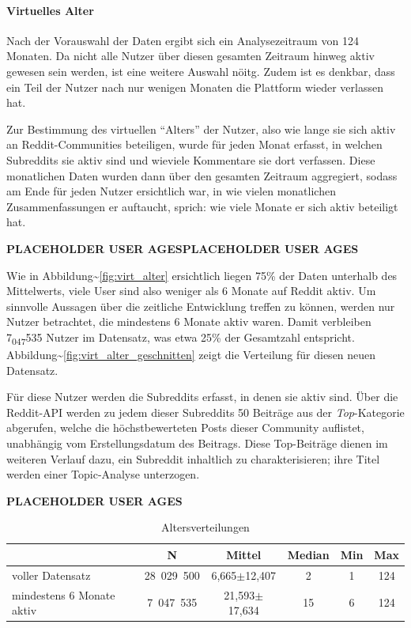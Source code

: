 \documentclass[11pt,a4paper,twoside]{article}
\let\oldpar\paragraph
\renewcommand{\paragraph}{\oldpar*}
\begin{document}
\hypertarget{virtage}{%
\paragraph{Virtuelles Alter}\label{virtage}}

Nach der Vorauswahl der Daten ergibt sich ein Analysezeitraum von 124
Monaten. Da nicht alle Nutzer über diesen gesamten Zeitraum hinweg aktiv
gewesen sein werden, ist eine weitere Auswahl nöitg. Zudem ist es
denkbar, dass ein Teil der Nutzer nach nur wenigen Monaten die Plattform
wieder verlassen hat.

Zur Bestimmung des virtuellen \enquote{Alters} der Nutzer, also wie
lange sie sich aktiv an Reddit-Communities beteiligen, wurde für jeden
Monat erfasst, in welchen Subreddits sie aktiv sind und wieviele
Kommentare sie dort verfassen. Diese monatlichen Daten wurden dann über
den gesamten Zeitraum aggregiert, sodass am Ende für jeden Nutzer
ersichtlich war, in wie vielen monatlichen Zusammenfassungen er
auftaucht, sprich: wie viele Monate er sich aktiv beteiligt hat.

\textbf{PLACEHOLDER USER AGESPLACEHOLDER USER AGES}

Wie in Abbildung\textasciitilde{}\ref{fig:virt_alter} ersichtlich liegen
75\% der Daten unterhalb des Mittelwerts, viele User sind also weniger
als 6 Monate auf Reddit aktiv. Um sinnvolle Aussagen über die zeitliche
Entwicklung treffen zu können, werden nur Nutzer betrachtet, die
mindestens 6 Monate aktiv waren. Damit verbleiben
7\textsubscript{047}535 Nutzer im Datensatz, was etwa 25\% der
Gesamtzahl entspricht.
Abbildung\textasciitilde{}\ref{fig:virt_alter_geschnitten} zeigt die
Verteilung für diesen neuen Datensatz.

Für diese Nutzer werden die Subreddits erfasst, in denen sie aktiv sind.
Über die Reddit-API werden zu jedem dieser Subreddits 50 Beiträge aus
der \textit{Top}-Kategorie abgerufen, welche die höchstbewerteten Posts
dieser Community auflistet, unabhängig vom Erstellungsdatum des
Beitrags. Diese Top-Beiträge dienen im weiteren Verlauf dazu, ein
Subreddit inhaltlich zu charakterisieren; ihre Titel werden einer
Topic-Analyse unterzogen.

\textbf{PLACEHOLDER USER AGES}

\begin{table}[h]
    \centering
    \begin{tabular}{lccccc}
        \toprule
        & N & Mittel & Median & Min & Max \\
        \midrule
        voller Datensatz & 28~029~500 & 6,665$\pm$12,407 & 2 & 1 & 124 \\
        mindestens 6 Monate aktiv & 7~047~535 & 21,593$\pm$17,634 & 15 & 6 & 124 \\
        \bottomrule
    \end{tabular}
    \caption{Altersverteilungen}%
    \label{tab:altersverteilungen}
\end{table}
\end{document}
